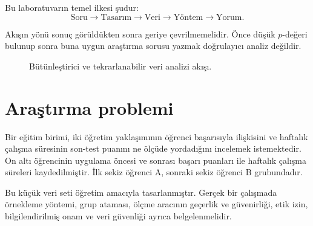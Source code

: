 Bu laboratuvarın temel ilkesi şudur:
\[
\text{Soru}\longrightarrow\text{Tasarım}\longrightarrow\text{Veri}
\longrightarrow\text{Yöntem}\longrightarrow\text{Yorum}.
\]

Akışın yönü sonuç görüldükten sonra geriye çevrilmemelidir. Önce düşük
$p$-değeri bulunup sonra buna uygun araştırma sorusu yazmak doğrulayıcı analiz
değildir.

\begin{figure}[htbp]
\centering
{}
\caption{Bütünleştirici ve tekrarlanabilir veri analizi akışı.}
\end{figure}

\section{Araştırma problemi}

Bir eğitim birimi, iki öğretim yaklaşımının öğrenci başarısıyla ilişkisini ve
haftalık çalışma süresinin son-test puanını ne ölçüde yordadığını incelemek
istemektedir. On altı öğrencinin uygulama öncesi ve sonrası başarı puanları ile
haftalık çalışma süreleri kaydedilmiştir. İlk sekiz öğrenci A, sonraki sekiz
öğrenci B grubundadır.

Bu küçük veri seti öğretim amacıyla tasarlanmıştır. Gerçek bir çalışmada
örnekleme yöntemi, grup ataması, ölçme aracının geçerlik ve güvenirliği, etik
izin, bilgilendirilmiş onam ve veri güvenliği ayrıca belgelenmelidir.

